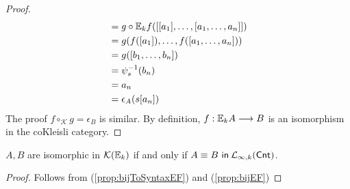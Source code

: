 \begin{prop}
\begin{proof}
\begin{align*}
&= g \circ {\mathbb{E}_{k}f}([[a_{1}],\dots,[a_{1},\dots,a_{n}]]) \\
&= g(f([a_{1}]),\dots,f([a_{1},\dots,a_{n}])) \\
&= g([b_{1},\dots,b_{n}]) \\
&= \psi_{s}^{-1}(b_{n})  \\
&= a_{n} \\ 
&= \epsilon_{A}(s[a_{n}]) 
\end{align*}
The proof $f \circ_{\mathcal{K}} g = \epsilon_{B}$ is similar. By definition, $f: {\mathbb{E}_{k}A} \longrightarrow B$ is an isomorphism in the coKleisli category.  
\end{proof}
\begin{cor}
$A,B$ are isomorphic in $\mathcal{K}({\mathbb{E}_{k}})$ if and only if ${A \equiv B \ \mathsf{in}\: \mathcal{L}_{\infty,k}(\mathsf{Cnt})}$.
\begin{proof}
Follows from (\ref{prop:bijToSyntaxEF}) and (\ref{prop:bijEF})
\end{proof}
\end{cor}
\label{prop:bijEF}
\end{prop}

